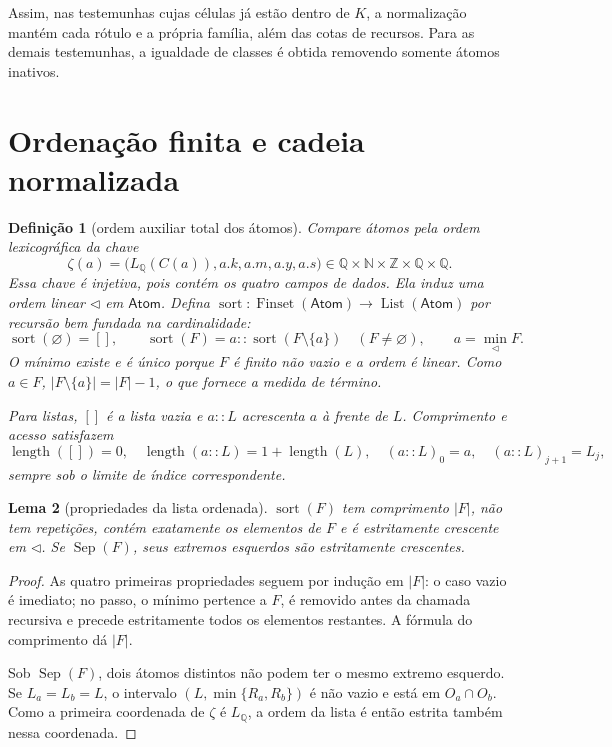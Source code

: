 \documentclass[11pt,a4paper]{article}
\newtheorem{definicao}{Definição}[section]
\newtheorem{lema}[definicao]{Lema}
\newcommand{\N}{\mathbb N}
\newcommand{\Z}{\mathbb Z}
\newcommand{\Q}{\mathbb Q}
\newcommand{\Atoms}{\mathsf{Atom}}
\newcommand{\FS}{\operatorname{Finset}}
\newcommand{\Sep}{\operatorname{Sep}}
\newcommand{\List}{\operatorname{List}}
\begin{document}
Assim, nas testemunhas cujas células já estão dentro de $K$, a
normalização mantém cada rótulo e a própria família, além das
cotas de recursos. Para as demais testemunhas, a igualdade de classes
é obtida removendo somente átomos inativos.

\section{Ordenação finita e cadeia normalizada}
\label{sec:chain}

\begin{definicao}[ordem auxiliar total dos átomos]\label{def:sort}
Compare átomos pela ordem lexicográfica da chave
\[
 \zeta(a)=\bigl(L_\Q(C(a)),a.k,a.m,a.y,a.s\bigr)
          \in\Q\times\N\times\Z\times\Q\times\Q.
\]
Essa chave é injetiva, pois contém os quatro campos de dados.
Ela induz uma ordem linear $\triangleleft$ em $\Atoms$.
Defina $\operatorname{sort}:\FS(\Atoms)\to\List(\Atoms)$ por
recursão bem fundada na cardinalidade:
\[
 \operatorname{sort}(\varnothing)=[],\qquad
 \operatorname{sort}(F)=a::\operatorname{sort}(F\setminus\{a\})
       \quad(F\ne\varnothing),
 \qquad a=\min_{\triangleleft}F.
\]
O mínimo existe e é único porque $F$ é finito não vazio e a ordem
é linear. Como $a\in F$,
$|F\setminus\{a\}|=|F|-1$, o que fornece a medida de término.

Para listas, $[]$ é a lista vazia e $a::L$ acrescenta $a$ à frente
de $L$. Comprimento e acesso satisfazem
\[
 \operatorname{length}([])=0,\quad
 \operatorname{length}(a::L)=1+\operatorname{length}(L),\quad
 (a::L)_0=a,\quad (a::L)_{j+1}=L_j,
\]
sempre sob o limite de índice correspondente.
\end{definicao}

\begin{lema}[propriedades da lista ordenada]\label{lem:sort}
$\operatorname{sort}(F)$ tem comprimento $|F|$, não tem repetições,
contém exatamente os elementos de $F$ e é estritamente crescente
em $\triangleleft$. Se $\Sep(F)$, seus extremos esquerdos são
estritamente crescentes.
\end{lema}
\begin{proof}
As quatro primeiras propriedades seguem por indução em $|F|$:
o caso vazio é imediato; no passo, o mínimo pertence a $F$, é
removido antes da chamada recursiva e precede estritamente todos
os elementos restantes. A fórmula do comprimento dá $|F|$.

Sob $\Sep(F)$, dois átomos distintos não podem ter o mesmo
extremo esquerdo. Se $L_a=L_b=L$, o intervalo
$(L,\min\{R_a,R_b\})$ é não vazio e está em $O_a\cap O_b$.
Como a primeira coordenada de $\zeta$ é $L_\Q$, a ordem da lista
é então estrita também nessa coordenada.
\end{proof}
\end{document}
